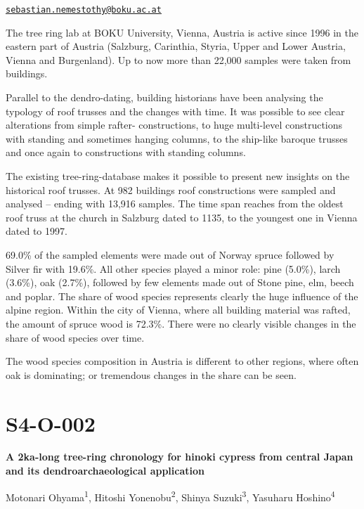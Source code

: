 \documentclass[
]{book}
\begin{document}
\href{mailto:sebastian.nemestothy@boku.ac.at}{\nolinkurl{sebastian.nemestothy@boku.ac.at}}

The tree ring lab at BOKU University, Vienna, Austria is active since 1996 in the eastern part of Austria (Salzburg, Carinthia, Styria, Upper and Lower Austria, Vienna and Burgenland). Up to now more than 22,000 samples were taken from buildings.

Parallel to the dendro-dating, building historians have been analysing the typology of roof trusses and the changes with time. It was possible to see clear alterations from simple rafter- constructions, to huge multi-level constructions with standing and sometimes hanging columns, to the ship-like baroque trusses and once again to constructions with standing columns.

The existing tree-ring-database makes it possible to present new insights on the historical roof trusses. At 982 buildings roof constructions were sampled and analysed -- ending with 13,916 samples. The time span reaches from the oldest roof truss at the church in Salzburg dated to 1135, to the youngest one in Vienna dated to 1997.

69.0\% of the sampled elements were made out of Norway spruce followed by Silver fir with 19.6\%. All other species played a minor role: pine (5.0\%), larch (3.6\%), oak (2.7\%), followed by few elements made out of Stone pine, elm, beech and poplar. The share of wood species represents clearly the huge influence of the alpine region. Within the city of Vienna, where all building material was rafted, the amount of spruce wood is 72.3\%. There were no clearly visible changes in the share of wood species over time.

The wood species composition in Austria is different to other regions, where often oak is dominating; or tremendous changes in the share can be seen.

\hypertarget{s4-o-002}{%
\section*{S4-O-002}\label{s4-o-002}}

\textbf{A 2ka-long tree-ring chronology for hinoki cypress from central Japan and its dendroarchaeological application}

Motonari Ohyama\textsuperscript{1}, Hitoshi Yonenobu\textsuperscript{2}, Shinya Suzuki\textsuperscript{3}, Yasuharu Hoshino\textsuperscript{4}
\end{document}
